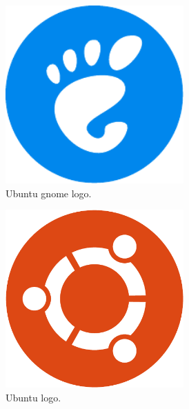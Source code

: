 \begin{figure}[!htbp]
	\centering
	\begin{subfigure}{0.3\textwidth}
		\centering
		\includegraphics[width=0.75\textwidth]{fig/ubuntu-gnome}
		\caption{Ubuntu \acrshort{gnome} logo.}\label{subfig:ubuntu_gnome}
	\end{subfigure}\quad
	\begin{subfigure}{0.3\textwidth}
		\centering
		\includegraphics[width=0.75\textwidth]{fig/ubuntu}
		\caption{Ubuntu logo.}\label{subfig:ubuntu}
	\end{subfigure}\quad
	\begin{subfigure}{0.3\textwidth}
		\centering

\end{subfigure}
\end{figure}
